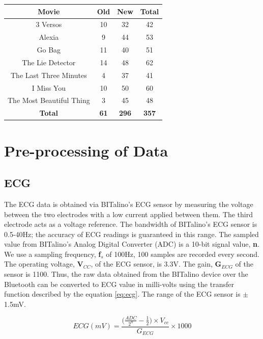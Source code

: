 \begin{center}
\begin{tabular}{ |c|c|c|c| }
\hline
Movie & Old & New & Total \\
\hline
\hline
3 Versos & 10 & 32 & 42 \\
\hline
Alexia & 9 & 44 & 53 \\
\hline
Go Bag & 11 & 40 & 51 \\
\hline
The Lie Detector & 14 & 48 & 62 \\
\hline
The Last Three Minutes & 4 & 37 & 41 \\
\hline
I Miss You & 10 & 50 & 60 \\
\hline
The Most Beautiful Thing & 3 & 45 & 48 \\
\hline
\textbf{Total} & \textbf{61} & \textbf{296} & \textbf{357} \\
\hline
\end{tabular}
\label{tab:eda_data_set}
\end{center}

\section{Pre-processing of Data}
\label{sec:preprocessing}
\subsection{ECG}
\label{sec:ecg_feature_extraction}
The ECG data is obtained via BITalino's ECG sensor by measuring the voltage between the two electrodes with a low current applied between them. The third electrode acts as a voltage reference. The bandwidth of BITalino's ECG sensor is 0.5-40Hz; the accuracy of ECG readings is guaranteed in this range. The sampled value from BITalino's Analog Digital Converter (ADC) is a 10-bit signal value, \textbf{n}. We use a sampling frequency, \textbf{f$_{s}$} of 100Hz, 100 samples are recorded every second. The operating voltage, \textbf{V$_{CC}$}, of the ECG sensor, is 3.3V. The gain, \textbf{G$_{ECG}$} of the sensor is 1100. Thus, the raw data obtained from the BITalino device over the Bluetooth can be converted to ECG value in milli-volts using the transfer function described by the equation \ref{eq:ecg}. The range of the ECG sensor is $\pm$1.5mV.

\begin{equation}
\label{eq:ecg}
    ECG(mV) = \frac{\big(\frac{ADC}{2^n} - \frac{1}{2})\times V_{cc}} {G_{ECG}}\times1000
\end{equation}

